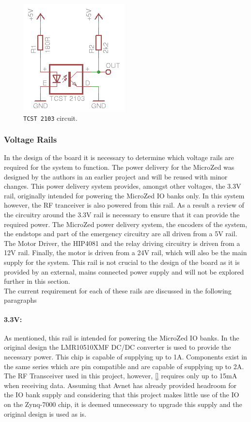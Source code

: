 \begin{figure}
	\centering
	\includegraphics[width=0.4\linewidth]{graphics/tcst_circuit_temp.jpg}
	\caption{\texttt{TCST 2103} circuit.}
	\label{fig:tcst_circuit}
\end{figure}



\subsubsection{Voltage Rails} %
\label{subsub:voltage_rails}
In the design of the board it is necessary to determine which voltage rails are required for the system to function.
The power delivery for the MicroZed was designed by the authors in an earlier project \cite{isaswarm} and will be reused with minor changes.
This power delivery system provides, amongst other voltages, the 3.3V rail, originally intended for powering the MicroZed IO banks only.
In this system however, the RF tranceiver is also powered from this rail.
As a result a review of the circuitry around the 3.3V rail is necessary to ensure that it can provide the required power.
The MicroZed power delivery system, the encoders of the system, the endstops and part of the emergency circuitry are all driven from a 5V rail.
The Motor Driver, the HIP4081 \cite{driver} and the relay driving circuitry is driven from a 12V rail.
Finally, the motor is driven from a 24V rail, which will also be the main supply for the system.
This rail is not crucial to the design of the board as it is provided by an external, mains connected power supply and will not be explored further in this section.\\
The current requirement for each of these rails are discussed in the following paragraphs

\paragraph{3.3V:} %
\label{par:3_3v}
As mentioned, this rail is intended for powering the MicroZed IO banks.
In the original design the LMR10510XMF DC/DC converter is used to provide the necessary power.
This chip is capable of supplying up to 1A.
Components exist in the same series which are pin compatible and are capable of supplying up to 2A.
The RF Transceiver used in this project, however, \ref{} requires only up to 15mA when receiving data.
Assuming that Avnet has already provided headroom for the IO bank supply and considering that this project makes little use of the IO on the Zynq-7000 chip, it is deemed unnecessary to upgrade this supply and the original design is used as is.

